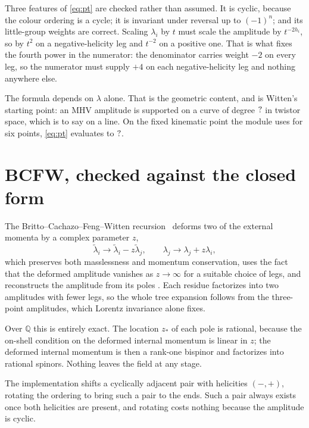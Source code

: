 \documentclass[11pt,a4paper]{article}
\newcommand{\QQ}{\mathbb{Q}}
\theoremstyle{definition}
\begin{document}
Three features of \cref{eq:pt} are checked rather than assumed. It is cyclic,
because the colour ordering is a cycle; it is invariant under reversal up to
$(-1)^n$; and its little-group weights are correct. Scaling $\lambda_i$ by
$t$ must scale the amplitude by $t^{-2h_i}$, so by $t^2$ on a
negative-helicity leg and $t^{-2}$ on a positive one. That is what fixes the
fourth power in the numerator: the denominator carries weight $-2$ on every
leg, so the numerator must supply $+4$ on each negative-helicity leg and
nothing anywhere else.

The formula depends on $\lambda$ alone. That is the geometric content, and is
Witten's starting point: an MHV amplitude \cite{CSW2004} is supported on a curve of degree
$?$ in twistor space, which is to say on a line. On the fixed
kinematic point the module uses for six points, \cref{eq:pt} evaluates to
$?$.


\section{BCFW, checked against the closed form}
\label{sec:bcfw}

The Britto--Cachazo--Feng--Witten recursion~\cite{BCF2005,BCFW2005} deforms
two of the external momenta by a complex parameter $z$,
%
\begin{equation}
\tilde\lambda_i \to \tilde\lambda_i - z \tilde\lambda_j ,
\qquad
\lambda_j \to \lambda_j + z \lambda_i ,
\label{eq:shift}
\end{equation}
%
which preserves both masslessness and momentum conservation, uses the fact
that the deformed amplitude vanishes as $z \to \infty$ for a suitable choice
of legs, and reconstructs the amplitude from its poles \cite{Hodges2009}. Each residue
factorizes into two amplitudes with fewer legs, so the whole tree expansion
follows from the three-point amplitudes, which Lorentz invariance alone fixes.

Over $\QQ$ this is entirely exact. The location $z_*$ of each pole is
rational, because the on-shell condition on the deformed internal momentum is
linear in $z$; the deformed internal momentum is then a rank-one bispinor and
factorizes into rational spinors. Nothing leaves the field at any stage.

The implementation shifts a cyclically adjacent pair with helicities
$(-,+)$, rotating the ordering to bring such a pair to the ends. Such a pair
always exists once both helicities are present, and rotating costs nothing
because the amplitude is cyclic.
\end{document}
